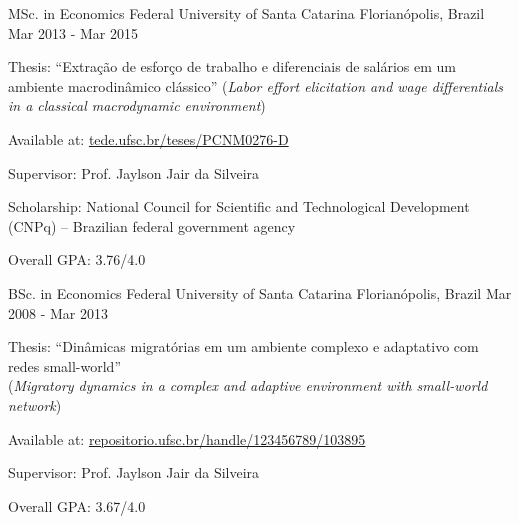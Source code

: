 \begin{cventries}
  \cventry
    {MSc. in Economics} %
    {Federal University of Santa Catarina} %
    {Florianópolis, Brazil} %
    {Mar 2013 - Mar 2015} %
    {
      \begin{cvitems} %
        \item {Thesis: ``Extração de esforço de trabalho e diferenciais de salários em um ambiente macrodinâmico clássico'' (\emph{Labor effort elicitation and wage differentials in a classical macrodynamic environment})}
        \item {Available at: \href{http://tede.ufsc.br/teses/PCNM0276-D.pdf}{tede.ufsc.br/teses/PCNM0276-D}}
        \item {Supervisor: Prof. Jaylson Jair da Silveira}
        \item {Scholarship: National Council for Scientific and Technological Development (CNPq) -- Brazilian federal government agency}
        \item {Overall GPA: 3.76/4.0}
      \end{cvitems}
    }

    \cventry
    {BSc. in Economics} %
    {Federal University of Santa Catarina} %
    {Florianópolis, Brazil} %
    {Mar 2008 - Mar 2013} %
    {
      \begin{cvitems} %
        \item {Thesis: ``Dinâmicas migratórias em um ambiente complexo e adaptativo com redes small-world'' \\ (\emph{Migratory dynamics in a complex and adaptive environment with small-world network})}
        \item {Available at: \href{https://repositorio.ufsc.br/handle/123456789/103895}{repositorio.ufsc.br/handle/123456789/103895}}
        \item {Supervisor: Prof. Jaylson Jair da Silveira}
        \item {Overall GPA: 3.67/4.0}
      \end{cvitems}
    }
\end{cventries}
